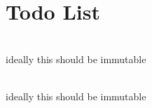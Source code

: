 \chapter{Todo List }
\hypertarget{todo}{}\label{todo}

\begin{DoxyRefList}
\item[{\parbox[t]{\linewidth}{Struct \doxylink{structNeoN_1_1la_1_1EllSparsityView}{NeoN\+::la\+::Ell\+Sparsity\+View\texorpdfstring{$<$}{<} Index\+Type \texorpdfstring{$>$}{>}} }}]\hfill \\
\label{todo__todo000002}%
%
ideally this should be immutable  
\item[{\parbox[t]{\linewidth}{Struct \doxylink{structNeoN_1_1la_1_1SparsityView}{NeoN\+::la\+::Sparsity\+View\texorpdfstring{$<$}{<} Index\+Type \texorpdfstring{$>$}{>}} }}]\hfill \\
\label{todo__todo000001}%
%
ideally this should be immutable 
\end{DoxyRefList}